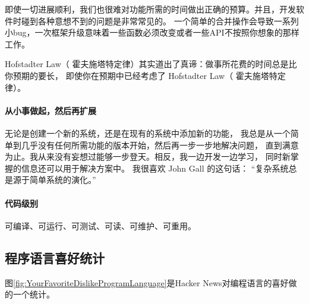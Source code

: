 \documentclass{book}
\begin{document}
即使一切进展顺利，我们也很难对功能所需的时间做出正确的预算。并且，开发软件时碰到各种意想不到的问题是非常常见的。
一个简单的合并操作会导致一系列小bug，一次框架升级意味着一些函数必须改变或者一些API不按照你想象的那样工作。

Hofstadter Law（ 霍夫施塔特定律）其实道出了真谛：做事所花费的时间总是比你预期的要长，
即使你在预期中已经考虑了 Hofstadter Law（ 霍夫施塔特定律）。

\paragraph{从小事做起，然后再扩展}

无论是创建一个新的系统，还是在现有的系统中添加新的功能，
我总是从一个简单到几乎没有任何所需功能的版本开始，然后再一步一步地解决问题，
直到满意为止。我从来没有妄想过能够一步登天。相反，我一边开发一边学习，
同时新掌握的信息还可以用于解决方案中。
我很喜欢 John Gall 的这句话：
“复杂系统总是源于简单系统的演化。”

\paragraph{代码级别}

可编译、可运行、可测试、可读、可维护、可重用。

\subsection{程序语言喜好统计}

图\ref{fig:YourFavoriteDislikeProgramLanguage}是Hacker News对编程语言的喜好做的一个统计。
\end{document}
